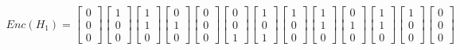 \documentclass[12pt]{article}
\begin{document}
\begin{example}
\begin{gather*}
Enc(H_1)=
\begin{bmatrix}
0 \\ 0 \\ 0
\end{bmatrix}\!\!
\begin{bmatrix}
1 \\ 0 \\ 0
\end{bmatrix}\!\!
\begin{bmatrix}
1 \\ 1 \\ 0
\end{bmatrix}\!\!
\begin{bmatrix}
0 \\1\\0
\end{bmatrix}\!\!
\begin{bmatrix}
0 \\0\\0
\end{bmatrix}\!\!
\begin{bmatrix}
0\\0\\1
\end{bmatrix}\!\!
\begin{bmatrix}
1\\0\\1
\end{bmatrix}\!\!
\begin{bmatrix}
1\\0\\0
\end{bmatrix}\!\!
\begin{bmatrix}
1\\1\\0
\end{bmatrix}\!\!
\begin{bmatrix}
0\\1\\0
\end{bmatrix}\!\!
\begin{bmatrix}
1\\1\\0
\end{bmatrix}\!\!
\begin{bmatrix}
1\\0\\0
\end{bmatrix}\!\!
\begin{bmatrix}
0\\0\\0
\end{bmatrix}\!\!
\end{gather*}

\end{example}
\end{document}
